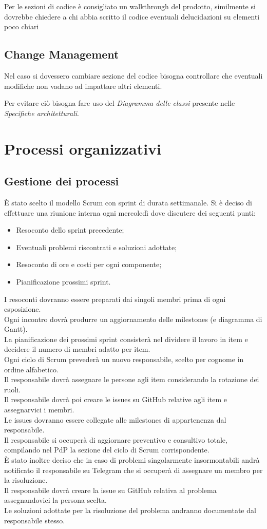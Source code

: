 \documentclass[a4paper, 12pt]{article}
\begin{document}
Per le sezioni di codice è consigliato un walkthrough del prodotto, similmente si dovrebbe chiedere a chi abbia scritto il codice eventuali delucidazioni su elementi poco chiari
\subsection{Change Management}
Nel caso si dovessero cambiare sezione del codice bisogna controllare che eventuali modifiche non vadano ad impattare altri elementi.

Per evitare ciò bisogna fare uso del \textit{Diagramma delle classi} presente nelle \textit{Specifiche architetturali}.
\section{Processi organizzativi}
\subsection{Gestione dei processi}
È stato scelto il modello Scrum con sprint di durata settimanale.
Si è deciso di effettuare una riunione interna ogni mercoledì dove discutere dei seguenti punti:
\begin{itemize}
\item Resoconto dello sprint precedente;
\item Eventuali problemi riscontrati e soluzioni adottate;
\item Resoconto di ore e costi per ogni componente;
\item Pianificazione prossimi sprint.
\end{itemize}
I resoconti dovranno essere preparati dai singoli membri prima di ogni esposizione.\\
Ogni incontro dovrà produrre un aggiornamento delle milestones (e diagramma di Gantt).\\
La pianificazione dei prossimi sprint consisterà nel dividere il lavoro in item e decidere il numero di membri adatto per item.\\
Ogni ciclo di Scrum prevederà un nuovo responsabile, scelto per cognome in ordine alfabetico.\\
Il responsabile dovrà assegnare le persone agli item considerando la rotazione dei ruoli.\\
Il responsabile dovrà poi creare le issues su GitHub relative agli item e assegnarvici i membri.\\
Le issues dovranno essere collegate alle milestones di appartenenza dal responsabile.\\
Il responsabile si occuperà di aggiornare preventivo e consultivo totale, compilando nel PdP la sezione del ciclo di Scrum corrispondente.\\
È stato inoltre deciso che in caso di problemi singolarmente insormontabili andrà notificato il responsabile su Telegram che si occuperà di assegnare
un membro per la risoluzione.\\
Il responsabile dovrà creare la issue su GitHub relativa al problema assegnandovici la persona scelta.\\
Le soluzioni adottate per la risoluzione del problema andranno documentate dal responsabile stesso.\\
\end{document}
